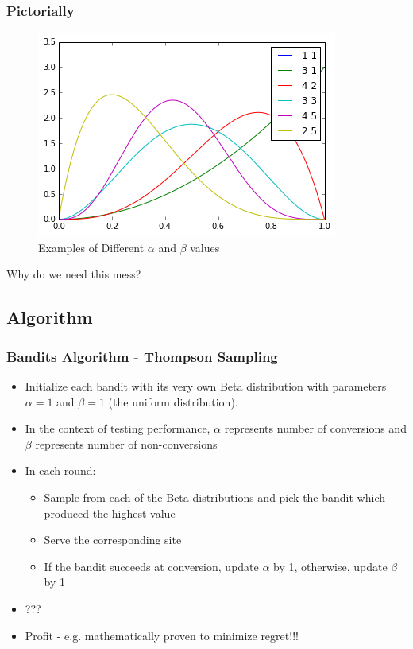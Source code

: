 \documentclass[]{beamer}
\theoremstyle{definition}
\begin{document}
\begin{frame}
\frametitle{Pictorially}
\begin{figure}[ht!] 
\centering
\includegraphics[width=0.7\linewidth]{resources/alpha_beta_charts.png}
\caption{Examples of Different $\alpha$ and $\beta$ values}
\end{figure}

Why do we need this mess?

\end{frame}


\subsection{Algorithm}
\begin{frame}
\frametitle{Bandits Algorithm - Thompson Sampling}
\begin{itemize}[<+->]
\item Initialize each bandit with its very own Beta distribution with parameters $\alpha = 1$ and $\beta = 1$ (the uniform distribution).
\item In the context of testing performance, $\alpha$ represents number of conversions and $\beta$ represents number of non-conversions
\item In each round:
\begin{itemize}
	\item Sample from each of the Beta distributions and pick the bandit which produced the highest value
	\item Serve the corresponding site
	\item If the bandit succeeds at conversion, update $\alpha$ by 1, otherwise, update $\beta$ by 1
\end{itemize}
\item ???
\item Profit - e.g. mathematically proven to minimize regret!!!
\end{itemize}
\end{frame}
\end{document}
